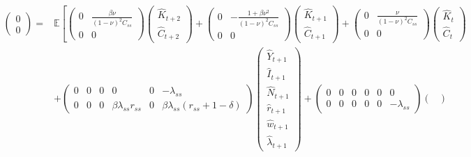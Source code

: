 \documentclass[11pt]{article}
\numberwithin{equation}{section} %
\numberwithin{figure}{section} %
\numberwithin{table}{section} %
\theoremstyle{definition}
\newcommand{\E}{\mathbb{E}}
\begin{document}
\begin{align*}
    \begin{pmatrix}
        0 \\ 0
    \end{pmatrix} = &\E \left[ \begin{pmatrix}
        0 & \frac{\beta \nu}{(1 - \nu)^2 C_{ss}} \\
        0 & 0
    \end{pmatrix} \begin{pmatrix}
        \hat{K}_{t+2} \\
        \hat{C}_{t+2}
    \end{pmatrix} + \begin{pmatrix}
        0 & -\frac{1 + \beta \nu^2}{(1 - \nu)^2 C_{ss}} \\
        0 & 0
    \end{pmatrix} \begin{pmatrix}
        \hat{K}_{t+1} \\
        \hat{C}_{t+1}
    \end{pmatrix} + \begin{pmatrix}
        0 & \frac{\nu}{(1 - \nu)^2 C_{ss}} \\
        0 & 0
    \end{pmatrix} \begin{pmatrix}
        \hat{K}_t \\
        \hat{C}_t
    \end{pmatrix}
    \right. \\
    &+ \begin{pmatrix}
        0 & 0 & 0 & 0 & 0 & -\lambda_{ss} \\
        0 & 0 & 0 & \beta \lambda_{ss} r_{ss} & 0 & \beta \lambda_{ss} (r_{ss} + 1 - \delta)
    \end{pmatrix} \begin{pmatrix}
        \hat{Y}_{t+1} \\
        \hat{I}_{t+1} \\
        \hat{N}_{t+1} \\
        \hat{r}_{t+1} \\
        \hat{w}_{t+1} \\
        \hat{\lambda}_{t+1}
    \end{pmatrix} + \begin{pmatrix}
        0 & 0 & 0 & 0 & 0 & 0 \\
        0 & 0 & 0 & 0 & 0 & -\lambda_{ss}
    \end{pmatrix} \begin{pmatrix}

\end{pmatrix}
\end{align*}
\end{document}
